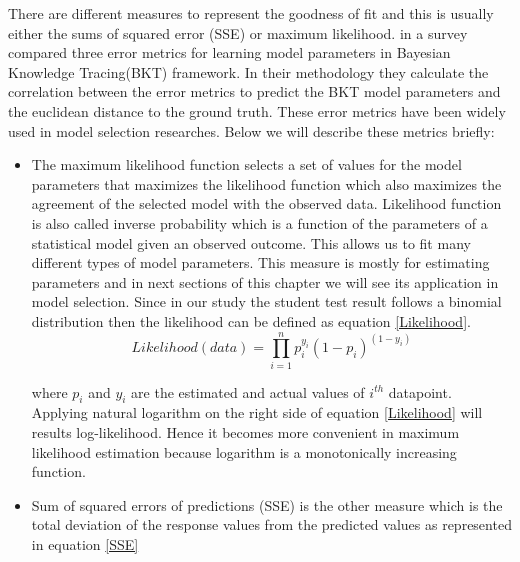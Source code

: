 There are different measures to represent the goodness of fit and this is usually either the sums of squared error (SSE) or maximum likelihood. \citet{dhanani2014comparison} in a survey compared three error metrics for learning model parameters in Bayesian Knowledge Tracing(BKT) framework. In their methodology they calculate the correlation between the error metrics to predict the BKT model parameters and the euclidean distance to the ground truth.  These error metrics have been widely used in model selection researches. Below we will describe these metrics briefly:

\begin{itemize}

\item The maximum likelihood function selects a set of values for the model parameters that maximizes the likelihood function which also maximizes the agreement of the selected model with the observed data. Likelihood function is also called inverse probability which is a function of the parameters of a statistical model given an observed outcome. This allows us to fit many different types of model parameters. This measure is mostly for estimating parameters and in next sections of this chapter we will see its application in model selection. Since in our study the student test result follows a binomial distribution then the likelihood can be defined as equation \ref{Likelihood}.
\begin{equation}
Likelihood(data) = \prod_{i=1}^{n} p_i^{y_i}(1-p_i)^{(1-y_i)}
\label{Likelihood}
\end{equation}

where $p_i$ and $y_i$ are the estimated and actual values of $i^{th}$ datapoint. Applying natural logarithm on the right side of equation \ref{Likelihood} will results log-likelihood. Hence it becomes more convenient in maximum likelihood estimation because logarithm is a monotonically increasing function.

\item Sum of squared errors of predictions (SSE) is the other measure which is the total deviation of the response values from the predicted values as represented in equation \ref{SSE}


\end{itemize}
